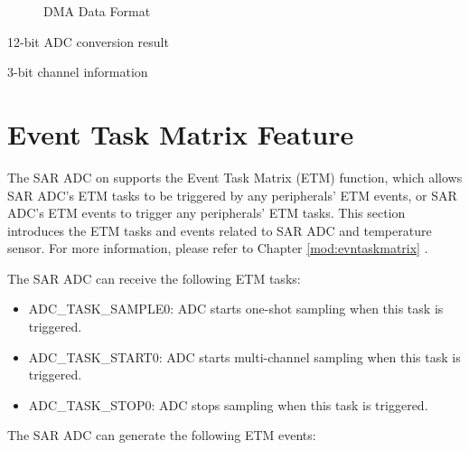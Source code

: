 \documentclass[main\_\_EN.tex]{subfiles}
\begin{document}
\begin{figure}[H]
\centering
{}%
%
%
%
%
\end{figure}
\vspace{-2em}
\begin{figure}[H]
    \centering
    \caption{DMA Data Format}
    \label{fig:adc-dma-data-format}
\end{figure}
\vspace{-2em}
\begin{regdesc}\begin{reglist}
\item [data] 12-bit ADC conversion result
\item [ch\_sel] 3-bit channel information
\end{reglist}\end{regdesc}



\section{Event Task Matrix Feature}
\label{sec:adc-etm-func}

The SAR ADC on \chipname{} supports the Event Task Matrix (ETM) function, which allows SAR ADC's ETM tasks to be triggered by any peripherals' ETM events, or SAR ADC's ETM events to trigger any peripherals' ETM tasks. This section introduces the ETM tasks and events related to SAR ADC and temperature sensor. For more information, please refer to Chapter \ref{mod:evntaskmatrix} .

The SAR ADC can receive the following ETM tasks:

\begin{itemize}
    \item ADC\_TASK\_SAMPLE0: ADC starts one-shot sampling when this task is triggered.
    \item ADC\_TASK\_START0: ADC starts multi-channel sampling when this task is triggered.
    \item ADC\_TASK\_STOP0: ADC stops sampling when this task is triggered.
\end{itemize}

The SAR ADC can generate the following ETM events:
\end{document}
